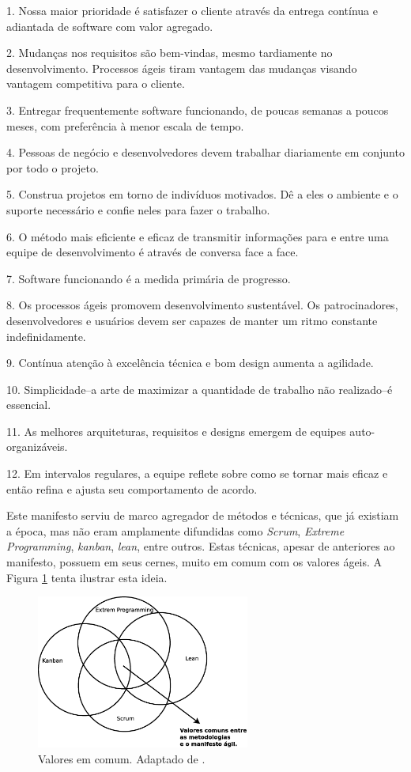 \begin{citacao}
		1. Nossa maior prioridade é satisfazer o cliente
		através da entrega contínua e adiantada
		de software com valor agregado.

		2. Mudanças nos requisitos são bem-vindas,
		mesmo tardiamente no desenvolvimento.
		Processos ágeis tiram vantagem das
		mudanças visando vantagem competitiva para o cliente.

		3. Entregar frequentemente software funcionando,
		de poucas semanas a poucos meses,
		com preferência à menor escala de tempo.

		4. Pessoas de negócio e desenvolvedores devem trabalhar
		diariamente em conjunto por todo o projeto.

		5. Construa projetos em torno de indivíduos motivados.
		Dê a eles o ambiente e o suporte necessário
		e confie neles para fazer o trabalho.

		6. O método mais eficiente e eficaz de transmitir
		informações para e entre uma equipe de desenvolvimento
		é através de conversa face a face.

		7. Software funcionando é a medida primária de progresso.

		8. Os processos ágeis promovem desenvolvimento
		sustentável. Os patrocinadores, desenvolvedores e
		usuários devem ser capazes de manter um ritmo
		constante indefinidamente.

		9. Contínua atenção à excelência técnica e bom design
		aumenta a agilidade.

		10. Simplicidade--a arte de maximizar a quantidade de
		trabalho não realizado--é essencial.

		11. As melhores arquiteturas, requisitos e designs
		emergem de equipes auto-organizáveis.

		12. Em intervalos regulares, a equipe reflete sobre como
		se tornar mais eficaz e então refina e ajusta seu
		comportamento de acordo. 
\end{citacao}

Este manifesto serviu de marco agregador de métodos e técnicas, que já existiam a época, mas não eram amplamente difundidas como \emph{Scrum}, \emph{Extreme Programming}, \emph{kanban}, \emph{lean}, entre outros. 
Estas técnicas, apesar de anteriores ao manifesto, possuem em seus cernes, muito em comum com os valores ágeis.
A Figura \ref{cap2_valores} tenta ilustrar esta ideia.
\begin{figure}[ht]
	\centering
	\includegraphics[width=7cm]{figuras/cap2_valores.eps}
	\caption{Valores em comum. Adaptado de \cite{Greene2014}.}
	\label{cap2_valores}
\end{figure}

